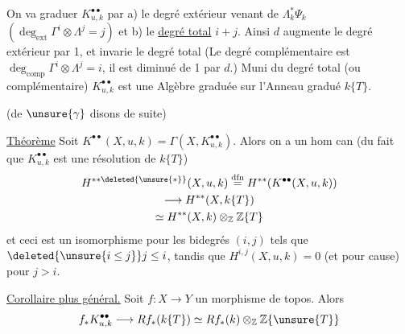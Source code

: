 On va graduer $K_{u,k}^{\bullet\bullet}$ par a) le degré extérieur venant de
$\Lambda_k^*\Psi_k$ $(\deg_{\mathrm{ext}}\Gamma^i\otimes\Lambda^j=j)$
et b) le \uline{degré total} $i+j$. Ainsi $d$ augmente le degré extérieur par 1,
et invarie le degré total 
(Le degré complémentaire est $\deg_{\mathrm{comp}}\Gamma^i\otimes\Lambda^j=i$,
il est diminué de 1 par $d$.) Muni du degré total (ou complémentaire)
$K_{u,k}^{\bullet\bullet}$ est une Algèbre graduée sur l'Anneau gradué $k\{T\}$.

 (de $\unsure{\gamma}$ disons de suite)

\uline{Théorème} Soit
$K^{\bullet\bullet}(X,u,k)=\Gamma(X,K_{u,k}^{\bullet\bullet})$.
Alors on a un hom can (du fait que $K_{u,k}^{\bullet\bullet}$
 est une résolution de $k\{T\}$)
\[
\begin{gathered}
H^{**\deleted{\unsure{*}}}(X,u,k)\overset{\mathrm{dfn}}=
H^{**}(K^{\bullet\bullet}(X,u,k))\\
\longrightarrow H^{**}(X,k\{T\})\\
\simeq H^{**}(X,k)\otimes_{\mathbb Z}\mathbb Z\{T\}
\end{gathered}
\]
et ceci est un isomorphisme pour les bidegrés $(i,j)$ tels que
$\deleted{\unsure{i\leq j}}j\leq i$, tandis que
$H^{i,j}(X,u,k)=0$ (et pour cause) pour $j>i$.


\uline{Corollaire plus général.} Soit $f:X\longrightarrow Y$ un morphisme de topos. Alors
\[
f_*K_{u,k}^{\bullet\bullet}\longrightarrow Rf_*(k\{T\})
\simeq Rf_*(k)\otimes_{\mathbb Z}\mathbb Z\{\unsure{T}\}
\]
